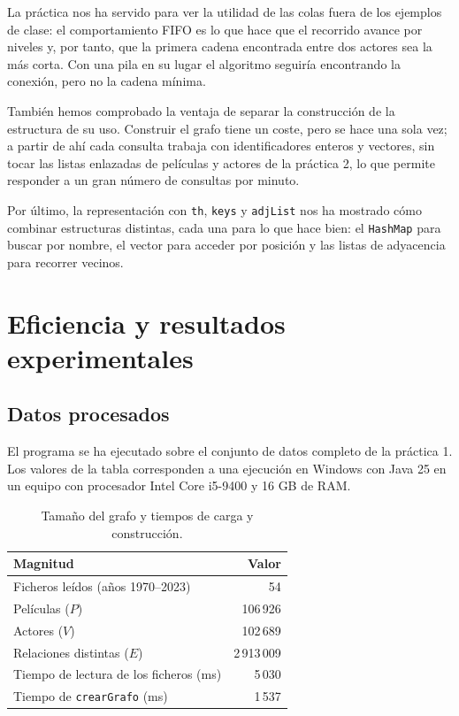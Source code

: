 \documentclass[a4paper,11pt]{report}
\begin{document}
La práctica nos ha servido para ver la utilidad de las colas fuera de los ejemplos de clase: el comportamiento FIFO es lo que hace que el recorrido avance por niveles y, por tanto, que la primera cadena encontrada entre dos actores sea la más corta. Con una pila en su lugar el algoritmo seguiría encontrando la conexión, pero no la cadena mínima.

También hemos comprobado la ventaja de separar la construcción de la estructura de su uso. Construir el grafo tiene un coste, pero se hace una sola vez; a partir de ahí cada consulta trabaja con identificadores enteros y vectores, sin tocar las listas enlazadas de películas y actores de la práctica 2, lo que permite responder a un gran número de consultas por minuto.

Por último, la representación con \texttt{th}, \texttt{keys} y \texttt{adjList} nos ha mostrado cómo combinar estructuras distintas, cada una para lo que hace bien: el \texttt{HashMap} para buscar por nombre, el vector para acceder por posición y las listas de adyacencia para recorrer vecinos.

\section{\label{resultados}Eficiencia y resultados experimentales}

\subsection{Datos procesados}
El programa se ha ejecutado sobre el conjunto de datos completo de la práctica 1. Los valores de la tabla corresponden a una ejecución en Windows con Java 25 en un equipo con procesador Intel Core i5-9400 y 16 GB de RAM.

\begin{table}[ht]
\centering
\begin{tabular}{l r}
\toprule
Magnitud & Valor \\
\midrule
Ficheros leídos (años 1970--2023) & 54 \\
Películas ($P$) & 106\,926 \\
Actores ($V$) & 102\,689 \\
Relaciones distintas ($E$) & 2\,913\,009 \\
Tiempo de lectura de los ficheros (ms) & 5\,030 \\
Tiempo de \texttt{crearGrafo} (ms) & 1\,537 \\
\bottomrule
\end{tabular}
\caption{Tamaño del grafo y tiempos de carga y construcción.}
\end{table}
\end{document}
